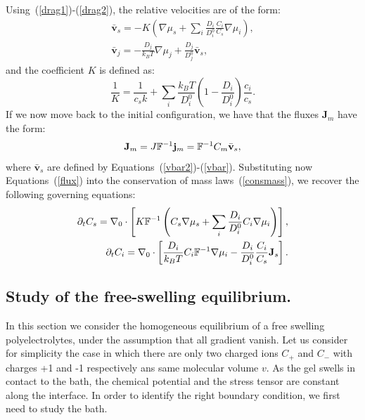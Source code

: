 Using~(\ref{drag1})-(\ref{drag2}), the relative velocities are of the form:
\begin{eqnarray}
\bar{\mathbf{v}}_s = -K  \left(\nabla \mu_s +\sum_i \frac{D_i}{D^0_i} \frac{C_i}{C_s} \nabla \mu_i\right),\label{vbar2}\\
\bar{\mathbf{v}}_j = - \frac{D_j}{k_B T}\nabla \mu_j + \frac{D_j}{D^0_j} \bar{\mathbf{v}}_s, \label{vbar}
\end{eqnarray}
and the coefficient $K$ is defined as:
\begin{equation}
\frac{1}{K} = \frac{1}{c_sk} + \sum_i \frac{k_B T}{D^0_i} \left(1-\frac{D_i}{D^0_i}\right) \frac{c_i}{c_s}.
\end{equation}
If we now move back to the initial configuration, we have that the fluxes $\mathbf{J}_m$ have the form:
\begin{eqnarray}
\mathbf{J}_m = J \mathbb{F}^{-1} \mathbf{j}_m=  \mathbb{F}^{-1} C_m \bar{\mathbf{v}}_s,\label{flux}
\end{eqnarray}
where $\bar{\mathbf{v}}_s$ are defined by Equations~(\ref{vbar2})-(\ref{vbar}). Substituting now Equations~(\ref{flux}) into the conservation of mass laws~(\ref{consmass}), we recover the following governing equations:
\begin{eqnarray}
\partial_t C_s=\nabla_0 \cdot\left[K \mathbb{F}^{-1}\left(C_s\nabla \mu_s +\sum_i \frac{D_i}{D^0_i} C_i \nabla \mu_i\right)\right],\label{gov2}\\
\partial_t C_i= \nabla_0\cdot\left[\frac{D_i}{k_B T}C_i\mathbb{F}^{-1}\nabla \mu_i -\frac{D_i}{D^0_i} \frac{C_i}{C_s} \mathbf{J}_s\right].\label{gov3}
\end{eqnarray}
\subsection{Study of the free-swelling equilibrium.}

In this section we consider the homogeneous equilibrium of a free swelling polyelectrolytes, under the assumption that all gradient vanish. Let us consider for simplicity the case in which there are only two charged ions $C_+$ and $C_-$ with charges +1 and -1 respectively ans same molecular volume $v$. As the gel swells in contact to the bath, the chemical potential and the stress tensor are constant along the interface. In order to identify the right boundary condition, we first need to study the bath.
